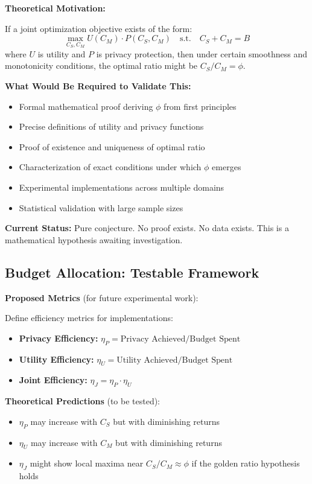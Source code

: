 \documentclass[11pt,a4paper]{article}
\theoremstyle{definition}
\begin{document}
\textbf{Theoretical Motivation:}

If a joint optimization objective exists of the form:
\[
\max_{C_S, C_M} U(C_M) \cdot P(C_S, C_M) \quad \text{s.t.} \quad C_S + C_M = B
\]
where $U$ is utility and $P$ is privacy protection, then under certain smoothness and monotonicity conditions, the optimal ratio might be $C_S/C_M = \phi$.

\textbf{What Would Be Required to Validate This:}

\begin{itemize}
    \item Formal mathematical proof deriving $\phi$ from first principles
    \item Precise definitions of utility and privacy functions
    \item Proof of existence and uniqueness of optimal ratio
    \item Characterization of exact conditions under which $\phi$ emerges
    \item Experimental implementations across multiple domains
    \item Statistical validation with large sample sizes
\end{itemize}

\textbf{Current Status:} Pure conjecture. No proof exists. No data exists. This is a mathematical hypothesis awaiting investigation.

\subsection{Budget Allocation: Testable Framework}

\textbf{Proposed Metrics} (for future experimental work):

Define efficiency metrics for implementations:

\begin{itemize}
    \item \textbf{Privacy Efficiency:} $\eta_P = \text{Privacy Achieved} / \text{Budget Spent}$
    \item \textbf{Utility Efficiency:} $\eta_U = \text{Utility Achieved} / \text{Budget Spent}$
    \item \textbf{Joint Efficiency:} $\eta_J = \eta_P \cdot \eta_U$
\end{itemize}

\textbf{Theoretical Predictions} (to be tested):

\begin{itemize}
    \item $\eta_P$ may increase with $C_S$ but with diminishing returns
    \item $\eta_U$ may increase with $C_M$ but with diminishing returns
    \item $\eta_J$ might show local maxima near $C_S/C_M \approx \phi$ if the golden ratio hypothesis holds
\end{itemize}
\end{document}

